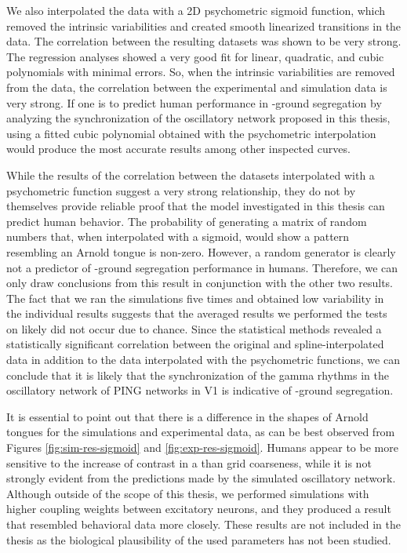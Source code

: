 We also interpolated the data with a 2D psychometric sigmoid function, which removed the intrinsic variabilities and created smooth linearized transitions in the data. The correlation between the resulting datasets was shown to be very strong. The regression analyses showed a very good fit for linear, quadratic, and cubic polynomials with minimal errors. So, when the intrinsic variabilities are removed from the data, the correlation between the experimental and simulation data is very strong.
If one is to predict human performance in \stimfig-ground segregation by analyzing the synchronization of the oscillatory network proposed in this thesis, using a fitted cubic polynomial obtained with the psychometric interpolation would produce the most accurate results among other inspected curves.

While the results of the correlation between the datasets interpolated with a psychometric function suggest a very strong relationship, they do not by themselves provide reliable proof that the model investigated in this thesis can predict human behavior. The probability of generating a matrix of random numbers that, when interpolated with a sigmoid, would show a pattern resembling an Arnold tongue is non-zero.
However, a random generator is clearly not a predictor of \stimfig-ground segregation performance in humans. Therefore, we can only draw conclusions from this result in conjunction with the other two results. The fact that we ran the simulations five times and obtained low variability in the individual results suggests that the averaged results we performed the tests on likely did not occur due to chance.
Since the statistical methods revealed a statistically significant correlation between the original and spline-interpolated data in addition to the data interpolated with the psychometric functions, we can conclude that it is likely that the synchronization of the gamma rhythms in the oscillatory network of PING networks in V1 is indicative of \stimfig-ground segregation.

It is essential to point out that there is a difference in the shapes of Arnold tongues for the simulations and experimental data, as can be best observed from Figures \ref{fig:sim-res-sigmoid} and \ref{fig:exp-res-sigmoid}. Humans appear to be more sensitive to the increase of contrast in a \stimfig{} than grid coarseness, while it is not strongly evident from the predictions made by the simulated oscillatory network. Although outside of the scope of this thesis, we performed simulations with higher coupling weights between excitatory neurons, and they produced a result that resembled behavioral data more closely. These results are not included in the thesis as the biological plausibility of the used parameters has not been studied.

